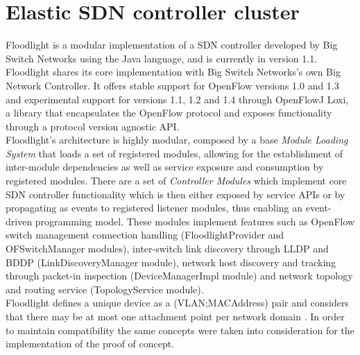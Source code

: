 \section{Elastic SDN controller cluster}
\label{section:SDN-controller-cluster-implementation}
Floodlight is a modular implementation of a \gls{SDN} controller developed by Big Switch Networks using the Java language, and is currently in version 1.1.
Floodlight shares its core implementation with Big Switch Networks's own Big Network Controller\cite{Floodlight}.
It offers stable support for OpenFlow versions 1.0 and 1.3 and experimental support for versions 1.1, 1.2 and 1.4 through OpenFlowJ Loxi, a library that encapsulates the OpenFlow protocol and exposes functionality through a protocol version agnostic \gls{API}\cite{LoxiGen}.\\
Floodlight's architecture is highly modular, composed by a base \emph{Module Loading System} that loads a set of registered modules, allowing for the establishment of inter-module dependencies as well as service exposure and consumption by registered modules\cite{FLArch}.
There are a set of \emph{Controller Modules} which implement core \gls{SDN} controller functionality which is then either exposed by service \glspl{API} or by propagating as events to registered listener modules, thus enabling an event-driven programming model.
These modules implement features such as OpenFlow switch management connection handling (FloodlightProvider and OFSwitchManager modules), inter-switch link discovery through \gls{LLDP} and \gls{BDDP} (LinkDiscoveryManager module), network host discovery and tracking through packet-in inspection (DeviceManagerImpl module) and network topology and routing service (TopologyService module).\\
Floodlight defines a unique device as a (\gls{VLAN};\gls{MACAddress}) pair and considers that there may be at most one attachment point per network domain \cite{FLArch}.
In order to maintain compatibility the same concepts were taken into consideration for the implementation of the proof of concept.\\
%
